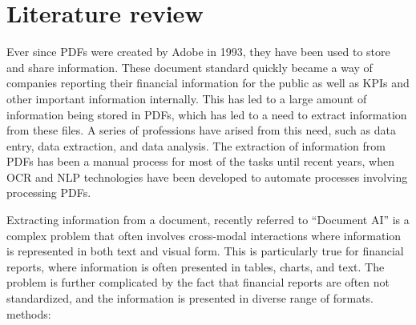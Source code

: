 \documentclass[english, 12pt, a4paper, elec, utf8, a-2b, online]{aaltothesis}
\begin{document}

\clearpage

\section{Literature review}

Ever since \ac{PDFs} were created by Adobe in 1993, they have been used to store and share information. These document standard quickly became a way of companies reporting their financial information for the public as well as KPIs and other important information internally. This has led to a large amount of information being stored in \ac{PDFs}, which has led to a need to extract information from these files. A series of professions have arised from this need, such as data entry, data extraction, and data analysis. The extraction of information from \ac{PDFs} has been a manual process for most of the tasks until recent years, when \ac{OCR} and \ac{NLP} technologies have been developed to automate processes involving processing \ac{PDFs}.

Extracting information from a document, recently referred to ``Document AI'' is a complex problem that often involves cross-modal interactions where information is represented in both text and visual form. This is particularly true for financial reports, where information is often presented in tables, charts, and text. The problem is further complicated by the fact that financial reports are often not standardized, and the information is presented in diverse range of formats.
%
methods:
\end{document}
